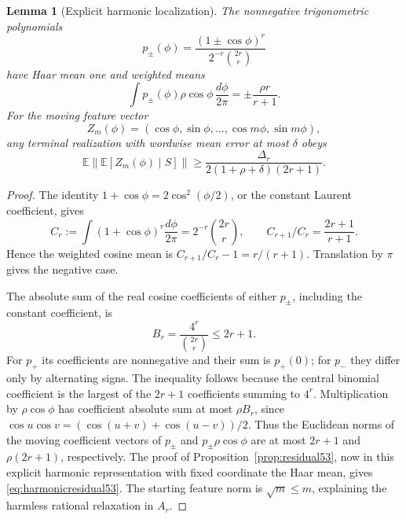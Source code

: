 \documentclass[11pt]{amsart}
\numberwithin{equation}{section}
\newtheorem{lemma}[theorem]{Lemma}
\theoremstyle{definition}
\theoremstyle{remark}
\newcommand{\E}{\mathbb E}
\newcommand{\norm}[1]{\lVert #1\rVert}
\begin{document}
\begin{lemma}[Explicit harmonic localization]\label{lem:harmonic53}
The nonnegative trigonometric polynomials
\[
 p_\pm(\phi)=\frac{(1\pm\cos\phi)^r}{2^{-r}\binom{2r}{r}}
\]
have Haar mean one and weighted means
\[
 \int p_\pm(\phi)\rho\cos\phi\,\frac{d\phi}{2\pi}
                         =\pm\frac{\rho r}{r+1}.
\]
For the moving feature vector
\[
 Z_m(\phi)=(\cos\phi,\sin\phi,\ldots,\cos m\phi,\sin m\phi),
\]
any terminal realization with wordwise mean error at most $\delta$ obeys
\begin{equation}\label{eq:harmonicresidual53}
 \E\norm{\E[Z_m(\phi)\mid S]}\ge
 \frac{\Delta_r}{2(1+\rho+\delta)(2r+1)}.
\end{equation}
\end{lemma}
\begin{proof}
The identity $1+\cos\phi=2\cos^2(\phi/2)$, or the constant Laurent coefficient, gives
\[
 C_r:=\int(1+\cos\phi)^r\frac{d\phi}{2\pi}
            =2^{-r}\binom{2r}{r},\qquad
 C_{r+1}/C_r=\frac{2r+1}{r+1}.
\]
Hence the weighted cosine mean is $C_{r+1}/C_r-1=r/(r+1)$. Translation by $\pi$ gives the negative case.

The absolute sum of the real cosine coefficients of either $p_\pm$, including the constant coefficient, is
\[
 B_r=\frac{4^r}{\binom{2r}{r}}\le2r+1.
\]
For $p_+$ its coefficients are nonnegative and their sum is $p_+(0)$; for $p_-$ they differ only by alternating signs. The inequality follows because the central binomial coefficient is the largest of the $2r+1$ coefficients summing to $4^r$. Multiplication by $\rho\cos\phi$ has coefficient absolute sum at most $\rho B_r$, since $\cos u\cos v=(\cos(u+v)+\cos(u-v))/2$. Thus the Euclidean norms of the moving coefficient vectors of $p_\pm$ and $p_\pm\rho\cos\phi$ are at most $2r+1$ and $\rho(2r+1)$, respectively. The proof of Proposition~\ref{prop:residual53}, now in this explicit harmonic representation with fixed coordinate the Haar mean, gives \eqref{eq:harmonicresidual53}. The starting feature norm is $\sqrt m\le m$, explaining the harmless rational relaxation in $A_r$.
\end{proof}
\end{document}
